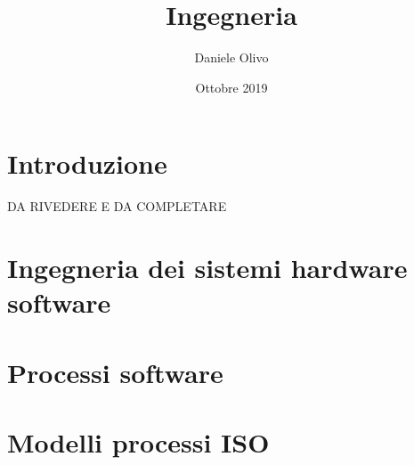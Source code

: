 \documentclass{article}
\title{Ingegneria}
\author{Daniele Olivo}
\date{Ottobre 2019}
\begin{document}
\maketitle

\tableofcontents{}
\newpage

\section{Introduzione}
DA RIVEDERE E DA COMPLETARE

\newpage

\section{Ingegneria dei sistemi hardware software}

\newpage

\section{Processi software}

\newpage

\addtocounter{section}{-1}
\section{Modelli processi ISO}

\newpage
\end{document}
